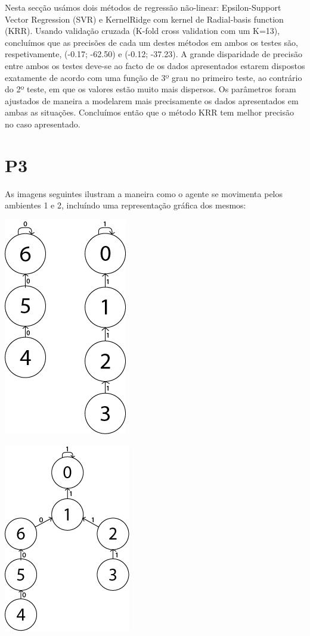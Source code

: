 \documentclass[11pt,twocolumn]{article}
\begin{document}
Nesta secção usámos dois métodos de regressão não-linear: Epsilon-Support Vector Regression (SVR) e KernelRidge com kernel de Radial-basis function (KRR).
Usando validação cruzada (K-fold cross validation com um K=13), concluímos que as precisões de cada um destes métodos em ambos os testes são, respetivamente, (-0.17; -62.50) e (-0.12; -37.23).
A grande disparidade de precisão entre ambos os testes deve-se ao facto de os dados apresentados estarem dispostos exatamente de acordo com uma função de 3º grau no primeiro teste,
ao contrário do 2º teste, em que os valores estão muito mais dispersos.
Os parâmetros foram ajustados de maneira a modelarem mais precisamente os dados apresentados em ambas as situações.
Concluímos então que o método KRR tem melhor precisão no caso apresentado.

\section*{P3}

As imagens seguintes ilustram a maneira como o agente se movimenta pelos ambientes 1 e 2, incluíndo uma representação gráfica dos mesmos:
	
\begin{center}
    \includegraphics[scale=0.4]{Trajetoria1.png}
\end{center}

\begin{center}
    \includegraphics[scale=0.4]{Trajetoria2.png}
\end{center}
\end{document}
